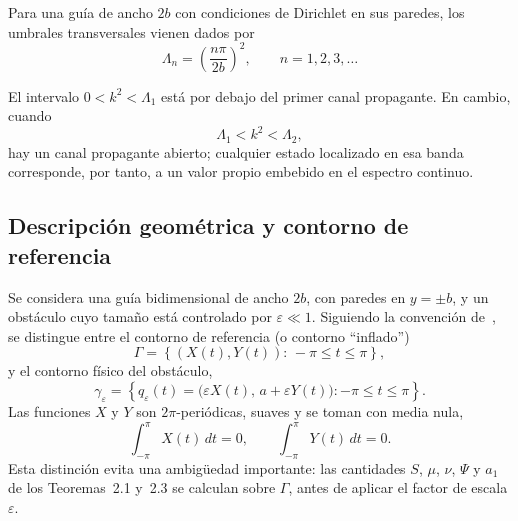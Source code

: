 \documentclass[11pt]{article}
\begin{document}
Para una guía de ancho \(2b\) con condiciones de Dirichlet en sus paredes, los umbrales transversales vienen dados por
\begin{equation}
\Lambda_n=
\left(\frac{n\pi}{2b}\right)^2,
\qquad
n=1,2,3,\ldots
\label{eq:thresholds}
\end{equation}

El intervalo \(0<k^2<\Lambda_1\) está por debajo del primer canal propagante. En cambio, cuando
\[
\Lambda_1<k^2<\Lambda_2,
\]
hay un canal propagante abierto; cualquier estado localizado en esa banda corresponde, por tanto, a un valor propio embebido en el espectro continuo.

\subsection{Descripción geométrica y contorno de referencia}

Se considera una guía bidimensional de ancho \(2b\), con paredes en \(y=\pm b\), y un obstáculo cuyo tamaño está controlado por \(\varepsilon\ll1\). Siguiendo la convención de~\cite{Zhevandrov2025}, se distingue entre el contorno de referencia (o contorno ``inflado'')
\begin{equation}
\Gamma=
\left\{
(X(t),Y(t)):\,-\pi\leq t\leq\pi
\right\},
\end{equation}
y el contorno físico del obstáculo,
\begin{equation}
\gamma_\varepsilon=
\left\{
q_\varepsilon(t)=
\bigl(\varepsilon X(t),\,a+\varepsilon Y(t)\bigr):
-\pi\leq t\leq\pi
\right\}.
\label{eq:scaled_obstacle}
\end{equation}
Las funciones \(X\) y \(Y\) son \(2\pi\)-periódicas, suaves y se toman con media nula,
\begin{equation}
\int_{-\pi}^{\pi}X(t)\,dt=0,
\qquad
\int_{-\pi}^{\pi}Y(t)\,dt=0.
\end{equation}
Esta distinción evita una ambigüedad importante: las cantidades \(S\), \(\mu\), \(\nu\), \(\Psi\) y \(a_1\) de los Teoremas~2.1 y~2.3 se calculan sobre \(\Gamma\), antes de aplicar el factor de escala \(\varepsilon\).
\end{document}

